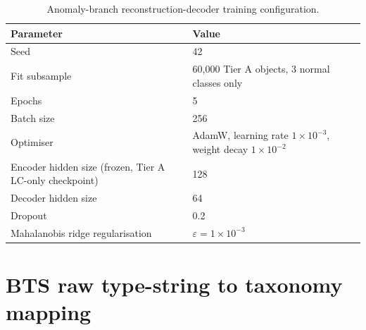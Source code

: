 \begin{table}[htb]
\centering
\caption{Anomaly-branch reconstruction-decoder training configuration.}
\begin{tabular}{L{5.2cm}L{8.3cm}}
\toprule
Parameter & Value \\
\midrule
Seed & 42 \\
Fit subsample & 60{,}000 Tier A objects, 3 normal classes only \\
Epochs & 5 \\
Batch size & 256 \\
Optimiser & AdamW, learning rate $1\times10^{-3}$, weight decay $1\times10^{-2}$ \\
Encoder hidden size (frozen, Tier A LC-only checkpoint) & 128 \\
Decoder hidden size & 64 \\
Dropout & 0.2 \\
Mahalanobis ridge regularisation & $\varepsilon = 1\times10^{-3}$ \\
\bottomrule
\end{tabular}
\end{table}

\chapter{BTS raw type-string to taxonomy mapping}
\label{sec:appendixb}

